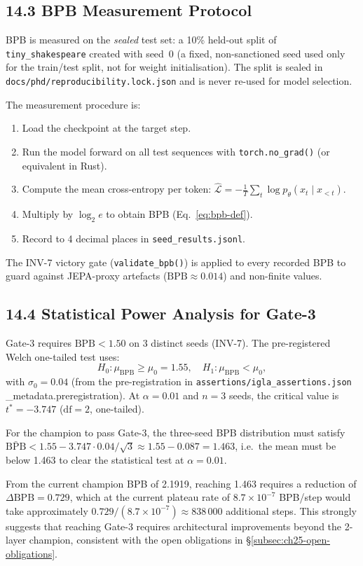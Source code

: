 \subsection{14.3 BPB Measurement Protocol}
\label{subsec:ch25-measurement-protocol}

BPB is measured on the \emph{sealed} test set:
a 10\% held-out split of \texttt{tiny\_shakespeare} created
with seed~0 (a fixed, non-sanctioned seed used only for the
train/test split, not for weight initialisation).  The split
is sealed in \texttt{docs/phd/reproducibility.lock.json} and
is never re-used for model selection.

The measurement procedure is:
\begin{enumerate}
  \item Load the checkpoint at the target step.
  \item Run the model forward on all test sequences with
    \texttt{torch.no\_grad()} (or equivalent in Rust).
  \item Compute the mean cross-entropy per token:
    $\hat{\mathcal{L}} = -\frac{1}{T}\sum_{t}\log p_\theta(x_t\mid x_{<t})$.
  \item Multiply by $\log_2 e$ to obtain BPB (Eq.~\ref{eq:bpb-def}).
  \item Record to 4 decimal places in \texttt{seed\_results.jsonl}.
\end{enumerate}
The INV-7 victory gate (\texttt{validate\_bpb()}) is applied to
every recorded BPB to guard against JEPA-proxy artefacts
($\mathrm{BPB} \approx 0.014$) and non-finite values.

\subsection{14.4 Statistical Power Analysis for Gate-3}
\label{subsec:ch25-power-analysis}

Gate-3 requires $\mathrm{BPB} < 1.50$ on 3 distinct seeds (INV-7).
The pre-registered Welch one-tailed test uses:
\[
  H_0: \mu_{\mathrm{BPB}} \ge \mu_0 = 1.55, \quad
  H_1: \mu_{\mathrm{BPB}} < \mu_0,
\]
with $\sigma_0 = 0.04$ (from the pre-registration in
\texttt{assertions/igla\_assertions.json} \_metadata.preregistration).
At $\alpha = 0.01$ and $n = 3$ seeds, the critical value is
$t^* = -3.747$ ($\mathrm{df}=2$, one-tailed).

For the champion to pass Gate-3, the three-seed BPB distribution
must satisfy $\bar{\mathrm{BPB}} < 1.55 - 3.747 \cdot 0.04/\sqrt{3}
\approx 1.55 - 0.087 = 1.463$, i.e.\ the mean must be below 1.463
to clear the statistical test at $\alpha=0.01$.

From the current champion BPB of 2.1919, reaching 1.463 requires
a reduction of $\Delta\mathrm{BPB} = 0.729$, which at the current
plateau rate of $8.7\times10^{-7}$ BPB/step would take approximately
$0.729 / (8.7\times10^{-7}) \approx 838\,000$ additional steps.
This strongly suggests that reaching Gate-3 requires architectural
improvements beyond the 2-layer champion, consistent with the
open obligations in §\ref{subsec:ch25-open-obligations}.

